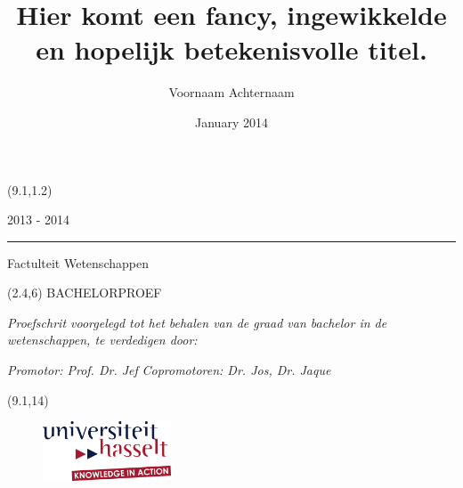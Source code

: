 \documentclass{article}
\title{Hier komt een fancy, ingewikkelde en hopelijk betekenisvolle titel.}  \let\Title\@title
\author{Voornaam Achternaam}                        \let\Author\@author
\date{January 2014}
\begin{document}

\thispagestyle{empty}

\begin{textblock}{7}(9.1,1.2)
    {\color{uhasselttext} 2013 - 2014 \rule{0.2mm}{2.1mm} }{\color{uhasseltblue} Factulteit Wetenschappen}
\end{textblock}

\begin{textblock}{6.5}(2.4,6)
    \vspace*{1.5cm}
    {\Large\noindent\color{uhasselttext} BACHELORPROEF}\newline
    
    \vspace{1.5cm}
    {\noindent\LARGE\bf\color{uhasseltblue} \Title}\newline
    
    \vspace{1.8cm}
    {\small\color{uhasselttext}\noindent\it Proefschrit voorgelegd tot het behalen van de graad van bachelor in de wetenschappen, te verdedigen door:}\newline
    
    {\noindent\color{uhasselttext}\bf \Author}\newline
    
    {\small\noindent\color{uhasselttext}\it Promotor: Prof. Dr. Jef}\newline
    {\small\noindent\color{uhasselttext}\it Copromotoren: Dr. Jos, Dr. Jaque}
    \vspace{1.5cm}
\end{textblock}

\begin{textblock}{6.5}(9.1,14)
    \begin{figure}[ht]
        \centering
        \includegraphics[width=1.5in]{images/logo_uhasselt}
    \end{figure}
\end{textblock}
\end{document}
